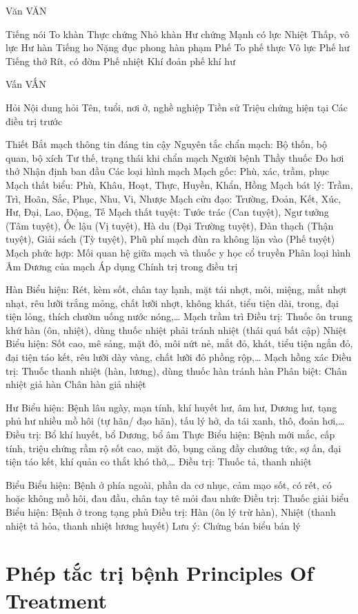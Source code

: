 \documentclass[
	11pt, %
]{beamer}
\theoremstyle{newblock}
\begin{document}
\begin{frame}{Văn}
	VĂN

Tiếng nói
To khàn  Thực chứng
Nhỏ khàn  Hư chứng
Mạnh có lực  Nhiệt
Thấp, vô lực  Hư hàn
Tiếng ho
Nặng đục  phong hàn phạm Phế
To  phế thực
Vô lực  Phế hư
Tiếng thở
Rít, có đờm  Phế nhiệt
Khí đoản  phế khí hư
\end{frame}


\begin{frame}{Vấn}
	VẤN

Hỏi
Nội dung hỏi
Tên, tuổi, nơi ở, nghề nghiệp
Tiền sử
Triệu chứng hiện tại
Các điều trị trước
\end{frame}
\begin{frame}{Thiết}
	Bắt mạch  thông tin đáng tin cậy
Nguyên tắc chẩn mạch: Bộ thốn, bộ quan, bộ xích
Tư thế, trạng thái khi chẩn mạch
Người bệnh
Thầy thuốc
Đo hơi thở
Nhận định ban đầu
Các loại hình mạch
Mạch gốc: Phù, xác, trầm, phục
Mạch thất biểu: Phù, Khâu, Hoạt, Thực, Huyền, Khẩn, Hồng
Mạch bát lý: Trầm, Trì, Hoãn, Sắc, Phục, Nhu, Vi, Nhược
Mạch cửu đạo: Trường, Đoản, Kết, Xúc, Hư, Đại, Lao, Động, Tế
Mạch thất tuyệt: Tước trác (Can tuyệt), Ngư tưởng (Tâm tuyệt), Ốc lậu (Vị tuyệt), Hà du (Đại Trường tuyệt), Đàn thạch (Thận tuyệt), Giải sách (Tỳ tuyệt), Phũ phí  mạch đùn ra không lặn vào (Phế tuyệt)
Mạch phức hợp:
Mối quan hệ giữa mạch và thuốc y học cổ truyền
Phân loại hình Âm Dương của mạch
Áp dụng Chính trị trong điều trị
\end{frame}
\begin{frame}
	Hàn 
	Biểu hiện: Rét, kèm sốt, chân tay lạnh,
mặt  tái  nhợt,  môi,  miệng,  mắt  nhợt nhạt,  rêu  lưỡi  trắng  mỏng,  chất  lưỡi nhợt, không khát, tiểu tiện dài, trong, đại tiện lỏng, thích chườm uống nước nóng,… Mạch trầm trì
Điều trị: Thuốc ôn trung khứ hàn (ôn, 	nhiệt),  dùng  thuốc  nhiệt  phải  tránh 	nhiệt (thái quá bất cập)
Nhiệt 
Biểu hiện: Sốt cao, mê sảng, mặt đỏ,
môi  nứt  nẻ,  mắt  đỏ,  khát,  tiểu  tiện ngắn đỏ, đại tiện táo kết, rêu lưỡi dày vàng, chất lưỡi đỏ phồng rộp,… Mạch hồng xác
Điều  trị:  Thuốc  thanh  nhiệt  (hàn, 	lương), dùng thuốc hàn tránh hàn
Phân biệt: Chân nhiệt giả hàn Chân 	hàn giả nhiệt
\end{frame}
\begin{frame}
	Hư
	Biểu  hiện:  Bệnh  lâu  ngày,  mạn  tính,
khí huyết hư, âm hư, Dương hư, tạng phủ hư  nhiều mồ hôi (tự hãn/ đạo hãn), tấu lý hở, da tái xanh, thô, đoản hơi,…
Điều trị: Bổ khí huyết, bổ Dương, bổ 	âm
Thực 
Biểu  hiện:  Bệnh  mới  mắc,  cấp  tính,
triệu chứng rầm rộ  sốt cao, mặt đỏ, bụng căng đầy chướng tức, sợ ấn, đại tiện  táo  kết,  khí  quản  co  thắt  khó thở,…
Điều trị: Thuốc tả, thanh nhiệt
\end{frame}
\begin{frame}
	Biểu
	Biểu hiện: Bệnh ở phía ngoài, phần da
cơ nhục, cảm mạo  sốt, có rét, có hoặc không mồ hôi, đau đầu, chân tay tê mỏi đau nhức
Điều trị: Thuốc giải biểu
Biểu hiện: Bệnh ở trong tạng phủ
Điều  trị:  Hàn  (ôn  lý  trừ  hàn),  Nhiệt 	(thanh nhiệt tả hỏa, thanh nhiệt lương 	huyết)
Lưu ý: Chứng bán biểu bán lý
\end{frame}

\section {Phép tắc trị bệnh \newline Principles Of Treatment}
\end{document}
